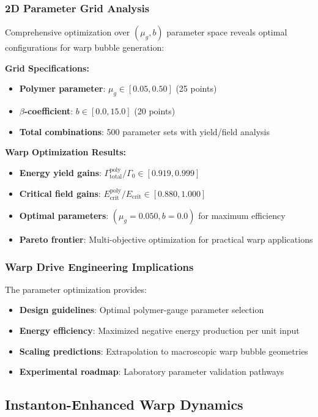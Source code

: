 \documentclass[11pt]{article}
\begin{document}
\subsubsection{2D Parameter Grid Analysis}
Comprehensive optimization over $(\mu_g, b)$ parameter space reveals optimal configurations for warp bubble generation:

\textbf{Grid Specifications:}
\begin{itemize}
    \item \textbf{Polymer parameter}: $\mu_g \in [0.05, 0.50]$ (25 points)
    \item \textbf{$\beta$-coefficient}: $b \in [0.0, 15.0]$ (20 points)  
    \item \textbf{Total combinations}: 500 parameter sets with yield/field analysis
\end{itemize}

\textbf{Warp Optimization Results:}
\begin{itemize}
    \item \textbf{Energy yield gains}: $\Gamma_{\text{total}}^{\text{poly}}/\Gamma_0 \in [0.919, 0.999]$
    \item \textbf{Critical field gains}: $E_{\text{crit}}^{\text{poly}}/E_{\text{crit}} \in [0.880, 1.000]$
    \item \textbf{Optimal parameters}: $(\mu_g = 0.050, b = 0.0)$ for maximum efficiency
    \item \textbf{Pareto frontier}: Multi-objective optimization for practical warp applications
\end{itemize}

\subsubsection{Warp Drive Engineering Implications}
The parameter optimization provides:
\begin{itemize}
    \item \textbf{Design guidelines}: Optimal polymer-gauge parameter selection
    \item \textbf{Energy efficiency}: Maximized negative energy production per unit input
    \item \textbf{Scaling predictions}: Extrapolation to macroscopic warp bubble geometries
    \item \textbf{Experimental roadmap}: Laboratory parameter validation pathways
\end{itemize}

\subsection{Instanton-Enhanced Warp Dynamics}
\end{document}
